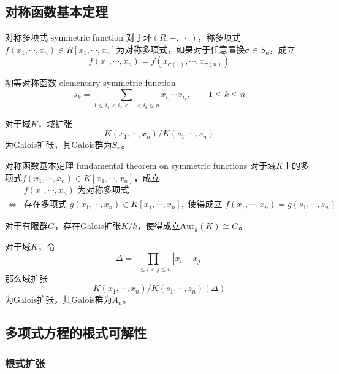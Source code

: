 \subsection{对称函数基本定理}

\begin{definition}{对称多项式 symmetric function}
	对于环$(R,+,\;\cdot\;)$，称多项式$f(x_1,\cdots,x_n)\in R[x_1,\cdots,x_n]$为对称多项式，如果对于任意置换$\sigma\in S_n$，成立%
	$$
	f(x_1,\cdots,x_n)=f(x_{\sigma(1)},\cdots,x_{\sigma(n)})
	$$
\end{definition}

\begin{definition}{初等对称函数 elementary symmetric function}
	$$
	s_k=\sum_{1\le i_1 < i_2 <\cdots <i_k \le n}x_{i_1}\cdots x_{i_k},\qquad 1\le k \le n
	$$
\end{definition}

\begin{lemma}
	对于域$K$，域扩张
	$$
	K(x_1,\cdots,x_n)/K(s_1,\cdots,s_n)
	$$
	为Galois扩张，其Galois群为$S_n$。
\end{lemma}

\begin{theorem}{对称函数基本定理 fundamental theorem on symmetric functions}
	对于域$K$上的多项式$f(x_1,\cdots,x_n)\in K[x_1,\cdots,x_n]$，成立%
	\begin{align*}
		&f(x_1,\cdots,x_n)\text{ 为对称多项式}\\
		\iff
		&\text{存在多项式 }g(x_1,\cdots,x_n)\in K[x_1,\cdots,x_n],\text{ 使得成立 }f(x_1,\cdots,x_n)=g(s_1,\cdots,s_n)
	\end{align*}
\end{theorem}

\begin{corollary}
	对于有限群$G$，存在Galois扩张$K/k$，使得成立$\text{Aut}_k(K)\cong G$。
\end{corollary}

\begin{corollary}
	对于域$K$，令%
	$$
	\Delta=\prod_{1\le i < j\le n}|x_i-x_j|
	$$
	那么域扩张%
	$$
	K(x_1,\cdots,x_n)/K(s_1,\cdots,s_n)(\Delta)
	$$
	为Galois扩张，其Galois群为$A_n$。
\end{corollary}

\subsection{多项式方程的根式可解性}

\subsubsection{根式扩张}

